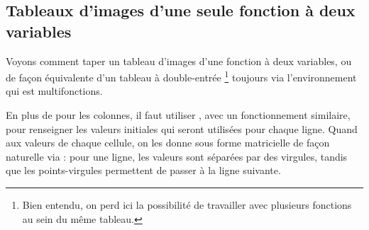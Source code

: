 \documentclass[10pt, a4paper]{article}
\begin{document}

\subsection{Tableaux d'images d'une seule fonction à deux variables}

Voyons comment taper un tableau d'images d'une fonction à deux variables, ou de façon équivalente d'un tableau à double-entrée
\footnote{
	Bien entendu, on perd ici la possibilité de travailler avec plusieurs fonctions au sein du même tableau.
}
toujours via l'environnement  qui est multifonctions.




\begin{tdocexa}
    En plus de  pour les colonnes, il faut utiliser , avec un fonctionnement similaire, pour renseigner les valeurs initiales qui seront utilisées pour chaque ligne.
    Quand aux valeurs de chaque cellule, on les donne sous forme matricielle de façon naturelle via  : pour une ligne, les valeurs sont séparées par des virgules, tandis que les points-virgules permettent de passer à la ligne suivante.

\end{tdocexa}




\begin{tdocexa}
    \leavevmode

\end{tdocexa}
\end{document}

